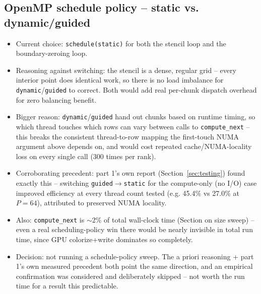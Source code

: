 \subsection{OpenMP schedule policy -- static vs. dynamic/guided}
\begin{itemize}
\item Current choice: \texttt{schedule(static)} for both the stencil loop and the boundary-zeroing loop.
\item Reasoning against switching: the stencil is a dense, regular grid -- every interior point does identical work, so there is no load imbalance for \texttt{dynamic}/\texttt{guided} to correct. Both would add real per-chunk dispatch overhead for zero balancing benefit.
\item Bigger reason: \texttt{dynamic}/\texttt{guided} hand out chunks based on runtime timing, so which thread touches which rows can vary between calls to \texttt{compute\_next} -- this breaks the consistent thread-to-row mapping the first-touch NUMA argument above depends on, and would cost repeated cache/NUMA-locality loss on every single call (300 times per rank).
\item Corroborating precedent: part 1's own report (Section~\ref{sec:testing}) found exactly this -- switching \texttt{guided}$\to$\texttt{static} for the compute-only (no I/O) case improved efficiency at every thread count tested (e.g. 45.4\% vs 27.0\% at $P=64$), attributed to preserved NUMA locality.
\item Also: \texttt{compute\_next} is $\sim$2\% of total wall-clock time (Section on size sweep) -- even a real scheduling-policy win there would be nearly invisible in total run time, since GPU colorize+write dominates so completely.
\item Decision: not running a schedule-policy sweep. The a priori reasoning + part 1's own measured precedent both point the same direction, and an empirical confirmation was considered and deliberately skipped -- not worth the run time for a result this predictable.
\end{itemize}


